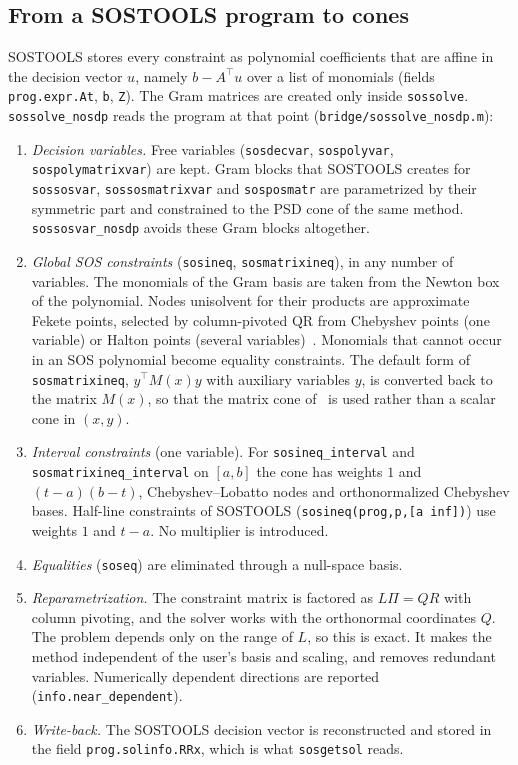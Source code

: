 \documentclass[11pt,a4paper]{article}
\newcommand{\code}[1]{\texttt{#1}}
\begin{document}
\subsection{From a SOSTOOLS program to cones}\label{sec:bridge}
SOSTOOLS stores every constraint as polynomial coefficients that are affine in the decision vector $u$, namely $b-A^\top u$ over a list of monomials (fields \code{prog.expr.At}, \code{b}, \code{Z}). The Gram matrices are created only inside \code{sossolve}. \code{sossolve\_nosdp} reads the program at that point (\code{bridge/sossolve\_nosdp.m}):
\begin{enumerate}[itemsep=2pt]
\item \emph{Decision variables.} Free variables (\code{sosdecvar}, \code{sospolyvar}, \code{sospolymatrixvar}) are kept. Gram blocks that SOSTOOLS creates for \code{sossosvar}, \code{sossosmatrixvar} and \code{sosposmatr} are parametrized by their symmetric part and constrained to the PSD cone of the same method. \code{sossosvar\_nosdp} avoids these Gram blocks altogether.
\item \emph{Global SOS constraints} (\code{sosineq}, \code{sosmatrixineq}), in any number of variables. The monomials of the Gram basis are taken from the Newton box of the polynomial. Nodes unisolvent for their products are approximate Fekete points, selected by column-pivoted QR from Chebyshev points (one variable) or Halton points (several variables)~\cite{SommarivaVianello2009,PappYildiz2019}. Monomials that cannot occur in an SOS polynomial become equality constraints. The default form of \code{sosmatrixineq}, $y^\top M(x)y$ with auxiliary variables $y$, is converted back to the matrix $M(x)$, so that the matrix cone of~\cite{KCV2023} is used rather than a scalar cone in $(x,y)$.
\item \emph{Interval constraints} (one variable). For \code{sosineq\_interval} and \code{sosmatrixineq\_interval} on $[a,b]$ the cone has weights $1$ and $(t-a)(b-t)$, Chebyshev--Lobatto nodes and orthonormalized Chebyshev bases. Half-line constraints of SOSTOOLS (\code{sosineq(prog,p,[a inf])}) use weights $1$ and $t-a$. No multiplier is introduced.
\item \emph{Equalities} (\code{soseq}) are eliminated through a null-space basis.
\item \emph{Reparametrization.} The constraint matrix is factored as $L\Pi=QR$ with column pivoting, and the solver works with the orthonormal coordinates $Q$. The problem depends only on the range of $L$, so this is exact. It makes the method independent of the user's basis and scaling, and removes redundant variables. Numerically dependent directions are reported (\code{info.near\_dependent}).
\item \emph{Write-back.} The SOSTOOLS decision vector is reconstructed and stored in the field \code{prog.solinfo.RRx}, which is what \code{sosgetsol} reads.
\end{enumerate}
\end{document}
